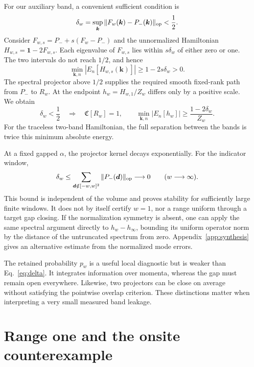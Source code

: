 \documentclass[aps,prb,onecolumn,nofootinbib,superscriptaddress]{revtex4-2}
\newcommand{\id}{\mathbf{1}}
\newcommand{\Ch}{\mathfrak C}
\newcommand{\bk}{\boldsymbol k}
\newcommand{\bd}{\boldsymbol d}
\begin{document}
For our auxiliary band, a convenient sufficient condition is
\begin{equation}
 \delta_w=\sup_{\bk}\|F_w(\bk)-P_-(\bk)\|_{\rm op}<\frac12.
 \label{eq:delta}
\end{equation}
Consider $F_{w,s}=P_-+s(F_w-P_-)$ and the unnormalized Hamiltonian
$H_{w,s}=\id-2F_{w,s}$. Each eigenvalue of $F_{w,s}$ lies within
$s\delta_w$ of either zero or one. The two intervals do not reach $1/2$,
and hence
\begin{equation}
 \min_{\bk,n}|E_n[H_{w,s}(\bk)]|\ge1-2s\delta_w>0.
 \label{eq:gap-bound}
\end{equation}
The spectral projector above $1/2$ supplies the required smooth fixed-rank
path from $P_-$ to $R_w$. At the endpoint $h_w=H_{w,1}/Z_w$ differs only
by a positive scale. We obtain
\begin{equation}
 \delta_w<\frac12\quad\Longrightarrow\quad
 \Ch[R_w]=1,\qquad
 \min_{\bk,n}|E_n[h_w]|\ge\frac{1-2\delta_w}{Z_w}.
 \label{eq:bound-result}
\end{equation}
For the traceless two-band Hamiltonian, the full separation between the
bands is twice this minimum absolute energy.

At a fixed gapped $\alpha$, the projector kernel decays exponentially.
For the indicator window,
\begin{equation}
 \delta_w\le\sum_{\bd\notin[-w,w]^2}\|P_-(\bd)\|_{\rm op}
 \longrightarrow0\qquad(w\longrightarrow\infty).
 \label{eq:tail}
\end{equation}
This bound is independent of the volume and proves stability for sufficiently
large finite windows. It does not by itself certify $w=1$, nor a range uniform
through a target gap closing. If the normalization symmetry is absent, one
can apply the same spectral argument directly to $h_w-h_\infty$, bounding
its uniform operator norm by the distance of the untruncated spectrum from
zero. Appendix~\ref{app:synthesis} gives an alternative estimate from the
normalized mode errors.

The retained probability $p_w$ is a useful local diagnostic but is weaker
than Eq.~\eqref{eq:delta}. It integrates information over momenta, whereas
the gap must remain open everywhere. Likewise, two projectors can be close
on average without satisfying the pointwise overlap criterion. These
distinctions matter when interpreting a very small measured band leakage.

\section{Range one and the onsite counterexample}
\label{sec:examples}
\end{document}

